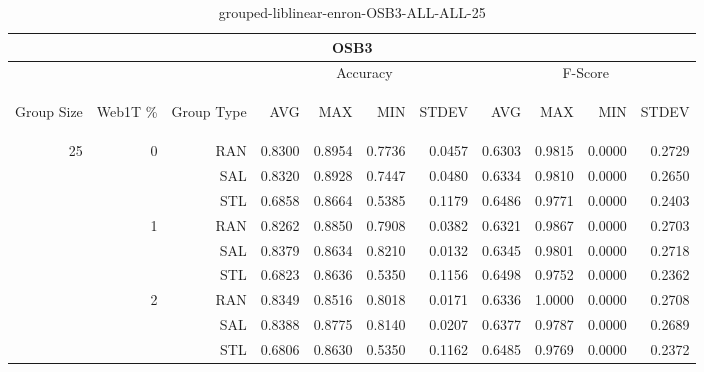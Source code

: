 \begin{center}
\begin{table}[htbp]
\begin{tabular}{ | r | r | r | r | r | r | r | r | r | r | r |}
\hline
\multicolumn{11}{|c|}{OSB3}\\
\hline
 & & & \multicolumn{4}{|c|}{Accuracy} & \multicolumn{4}{|c|}{F-Score}\\ \cline{4-11}
\begin{sideways}Group Size\end{sideways} & \begin{sideways}Web1T \%\end{sideways} & \begin{sideways}Group Type\end{sideways} & \begin{sideways}AVG\end{sideways} & \begin{sideways}MAX\end{sideways} & \begin{sideways}MIN\end{sideways} & \begin{sideways}STDEV\end{sideways} & \begin{sideways}AVG\end{sideways} & \begin{sideways}MAX\end{sideways} & \begin{sideways}MIN\end{sideways} & \begin{sideways}STDEV\end{sideways}\\
\hline
\multirow{9}{*}{25}
 & \multirow{3}{*}{0} & RAN & 0.8300 & 0.8954 & 0.7736 & 0.0457 & 0.6303 & 0.9815 & 0.0000 & 0.2729\\ \cline{3-11}
 &   & SAL & 0.8320 & 0.8928 & 0.7447 & 0.0480 & 0.6334 & 0.9810 & 0.0000 & 0.2650\\ \cline{3-11}
 &   & STL & 0.6858 & 0.8664 & 0.5385 & 0.1179 & 0.6486 & 0.9771 & 0.0000 & 0.2403\\ \cline{2-11}
 & \multirow{3}{*}{1} & RAN & 0.8262 & 0.8850 & 0.7908 & 0.0382 & 0.6321 & 0.9867 & 0.0000 & 0.2703\\ \cline{3-11}
 &   & SAL & 0.8379 & 0.8634 & 0.8210 & 0.0132 & 0.6345 & 0.9801 & 0.0000 & 0.2718\\ \cline{3-11}
 &   & STL & 0.6823 & 0.8636 & 0.5350 & 0.1156 & 0.6498 & 0.9752 & 0.0000 & 0.2362\\ \cline{2-11}
 & \multirow{3}{*}{2} & RAN & 0.8349 & 0.8516 & 0.8018 & 0.0171 & 0.6336 & 1.0000 & 0.0000 & 0.2708\\ \cline{3-11}
 &   & SAL & 0.8388 & 0.8775 & 0.8140 & 0.0207 & 0.6377 & 0.9787 & 0.0000 & 0.2689\\ \cline{3-11}
 &   & STL & 0.6806 & 0.8630 & 0.5350 & 0.1162 & 0.6485 & 0.9769 & 0.0000 & 0.2372\\ \cline{2-11}
\hline
\end{tabular}
\caption{grouped-liblinear-enron-OSB3-ALL-ALL-25}
\end{table}
\end{center}

